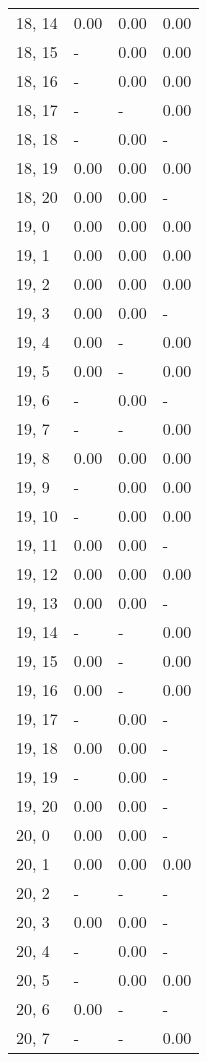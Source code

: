 \begin{table}
\begin{tabular}{llll}
18, 14 &  0.00 &  0.00 &  0.00 \\
18, 15 &     - &  0.00 &  0.00 \\
18, 16 &     - &  0.00 &  0.00 \\
18, 17 &     - &     - &  0.00 \\
18, 18 &     - &  0.00 &     - \\
18, 19 &  0.00 &  0.00 &  0.00 \\
18, 20 &  0.00 &  0.00 &     - \\
19, 0  &  0.00 &  0.00 &  0.00 \\
19, 1  &  0.00 &  0.00 &  0.00 \\
19, 2  &  0.00 &  0.00 &  0.00 \\
19, 3  &  0.00 &  0.00 &     - \\
19, 4  &  0.00 &     - &  0.00 \\
19, 5  &  0.00 &     - &  0.00 \\
19, 6  &     - &  0.00 &     - \\
19, 7  &     - &     - &  0.00 \\
19, 8  &  0.00 &  0.00 &  0.00 \\
19, 9  &     - &  0.00 &  0.00 \\
19, 10 &     - &  0.00 &  0.00 \\
19, 11 &  0.00 &  0.00 &     - \\
19, 12 &  0.00 &  0.00 &  0.00 \\
19, 13 &  0.00 &  0.00 &     - \\
19, 14 &     - &     - &  0.00 \\
19, 15 &  0.00 &     - &  0.00 \\
19, 16 &  0.00 &     - &  0.00 \\
19, 17 &     - &  0.00 &     - \\
19, 18 &  0.00 &  0.00 &     - \\
19, 19 &     - &  0.00 &     - \\
19, 20 &  0.00 &  0.00 &     - \\
20, 0  &  0.00 &  0.00 &     - \\
20, 1  &  0.00 &  0.00 &  0.00 \\
20, 2  &     - &     - &     - \\
20, 3  &  0.00 &  0.00 &     - \\
20, 4  &     - &  0.00 &     - \\
20, 5  &     - &  0.00 &  0.00 \\
20, 6  &  0.00 &     - &     - \\
20, 7  &     - &     - &  0.00 \\

\end{tabular}
\end{table}
